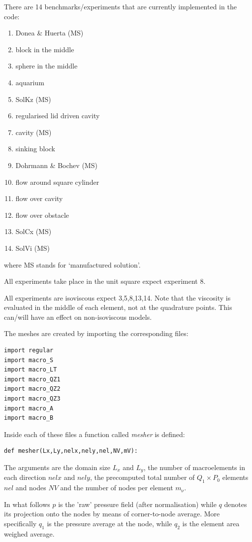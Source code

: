 There are 14 benchmarks/experiments that are currently implemented in the code:
\begin{enumerate}
\item Donea \& Huerta (MS) %
\item block in the middle %
\item sphere in the middle %
\item aquarium %
\item SolKz (MS) %
\item regularised lid driven cavity %
\item cavity (MS) %
\item sinking block %
\item Dohrmann \& Bochev (MS) \cite{dobo04} %
\item flow around square cylinder %
\item flow over cavity %
\item flow over obstacle %
\item SolCx (MS) %
\item SolVi (MS) %
\end{enumerate}
where MS stands for `manufactured solution'.

All experiments take place in the unit square expect experiment 8.

All experiments are isoviscous expect 3,5,8,13,14.
Note that the viscosity is evaluated in the middle of each element, not 
at the quadrature points. This can/will have an effect on non-isoviscous models.

\newpage
The meshes are created by importing the corresponding files:
\begin{lstlisting} 
import regular
import macro_S
import macro_LT
import macro_QZ1 
import macro_QZ2
import macro_QZ3
import macro_A
import macro_B
\end{lstlisting} 
Inside each of these files a function called {\sl mesher} is defined: 
\begin{lstlisting} 
def mesher(Lx,Ly,nelx,nely,nel,NV,mV):
\end{lstlisting} 
The arguments are the domain size $L_x$ and $L_y$, the number of macroelements
in each direction $nelx$ and $nely$, the precomputed total number of $Q_1\times P_0$ 
elements $nel$ and nodes $NV$ and the number of nodes per element $m_\upnu$.  

In what follows $p$ is the 'raw' pressure field (after normalisation)
while $q$ denotes its projection onto the nodes by means of corner-to-node average.
More specifically $q_1$ is the pressure average at the node, 
while $q_2$  is the element area weighed average.

